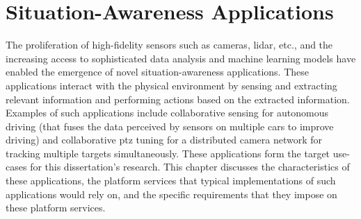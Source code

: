 \chapter{Situation-Awareness Applications}
\label{sec:apps}
The proliferation of high-fidelity sensors such as cameras, \gls{lidar}, etc., and the increasing access to sophisticated data analysis and machine learning models have enabled the emergence of novel situation-awareness applications. These applications interact with the physical environment by sensing and extracting relevant information and performing actions based on the extracted information. Examples of such applications include collaborative sensing for autonomous driving (that fuses the data perceived by sensors on multiple cars to improve driving) and collaborative \gls{ptz} tuning for a distributed camera network for tracking multiple targets simultaneously. These applications form the target use-cases for this dissertation's research. This chapter discusses the characteristics of these applications, the platform services that typical implementations of such applications would rely on, and the specific requirements that they impose on these platform services.
